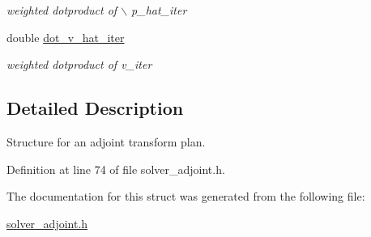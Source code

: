 \begin{CompactItemize}
\begin{CompactList}\small\item\em weighted dotproduct of $\backslash$ p\_\-hat\_\-iter \item\end{CompactList}\item 
\hypertarget{structinnfft__adjoint__plan_o17}{
double \hyperlink{structinnfft__adjoint__plan_o17}{dot\_\-v\_\-hat\_\-iter}}
\label{structinnfft__adjoint__plan_o17}

\begin{CompactList}\small\item\em weighted dotproduct of v\_\-iter \item\end{CompactList}\end{CompactItemize}


\subsection{Detailed Description}
Structure for an adjoint transform plan. 



Definition at line 74 of file solver\_\-adjoint.h.

The documentation for this struct was generated from the following file:\begin{CompactItemize}
\item 
\hyperlink{solver__adjoint_8h}{solver\_\-adjoint.h}\end{CompactItemize}

